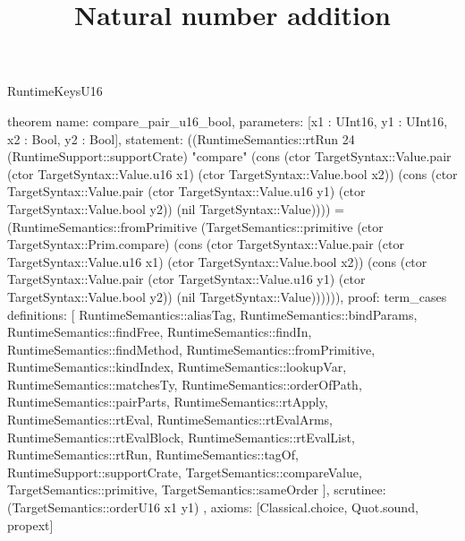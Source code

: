 \begin{lexlean}{RuntimeKeysU16}
\title{Natural number addition}
\begin{semanticmodule}
theorem{
  name: compare_pair_u16_bool,
  parameters: [x1 : UInt16, y1 : UInt16, x2 : Bool, y2 : Bool],
  statement: ((RuntimeSemantics::rtRun 24 (RuntimeSupport::supportCrate) "compare" (cons (ctor TargetSyntax::Value.pair (ctor TargetSyntax::Value.u16 x1) (ctor TargetSyntax::Value.bool x2)) (cons (ctor TargetSyntax::Value.pair (ctor TargetSyntax::Value.u16 y1) (ctor TargetSyntax::Value.bool y2)) (nil TargetSyntax::Value)))) = (RuntimeSemantics::fromPrimitive (TargetSemantics::primitive (ctor TargetSyntax::Prim.compare) (cons (ctor TargetSyntax::Value.pair (ctor TargetSyntax::Value.u16 x1) (ctor TargetSyntax::Value.bool x2)) (cons (ctor TargetSyntax::Value.pair (ctor TargetSyntax::Value.u16 y1) (ctor TargetSyntax::Value.bool y2)) (nil TargetSyntax::Value)))))),
  proof: term_cases{
    definitions: [
      RuntimeSemantics::aliasTag,
      RuntimeSemantics::bindParams,
      RuntimeSemantics::findFree,
      RuntimeSemantics::findIn,
      RuntimeSemantics::findMethod,
      RuntimeSemantics::fromPrimitive,
      RuntimeSemantics::kindIndex,
      RuntimeSemantics::lookupVar,
      RuntimeSemantics::matchesTy,
      RuntimeSemantics::orderOfPath,
      RuntimeSemantics::pairParts,
      RuntimeSemantics::rtApply,
      RuntimeSemantics::rtEval,
      RuntimeSemantics::rtEvalArms,
      RuntimeSemantics::rtEvalBlock,
      RuntimeSemantics::rtEvalList,
      RuntimeSemantics::rtRun,
      RuntimeSemantics::tagOf,
      RuntimeSupport::supportCrate,
      TargetSemantics::compareValue,
      TargetSemantics::primitive,
      TargetSemantics::sameOrder
    ],
    scrutinee: (TargetSemantics::orderU16 x1 y1)
  },
  axioms: [Classical.choice, Quot.sound, propext]
}


\end{semanticmodule}
\end{lexlean}
